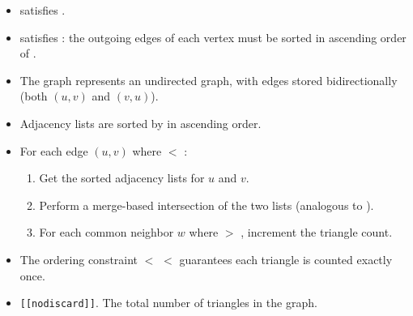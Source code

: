 {\small
      
}
\begin{itemdescr}
      \pnum\mandates
            \begin{itemize}
                  \item {} satisfies .
                  \item {} satisfies : the outgoing edges of each vertex
                        must be sorted in ascending order of .
            \end{itemize}
      \pnum\preconditions
            \begin{itemize}
                  \item The graph represents an undirected graph, with edges stored bidirectionally
                        (both $(u,v)$ and $(v,u)$).
                  \item Adjacency lists are sorted by  in ascending order.
            \end{itemize}
      \pnum\effects
            \begin{itemize}
                  \item For each edge $(u,v)$ where  $<$ :
                  \begin{enumerate}
                        \item Get the sorted adjacency lists for $u$ and $v$.
                        \item Perform a merge-based intersection of the two lists
                              (analogous to ).
                        \item For each common neighbor $w$ where  $>$ ,
                              increment the triangle count.
                  \end{enumerate}
                  \item The ordering constraint
                         $<$  $<$ 
                        guarantees each triangle is counted exactly once.
            \end{itemize}
      \pnum\returns 
            \begin{itemize}
                  \item \lstinline{[[nodiscard]]}. The total number of triangles in the graph.

\end{itemize}
\end{itemdescr}
